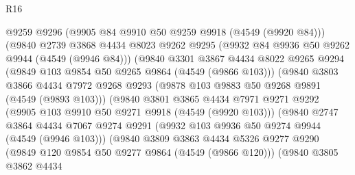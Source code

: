 \begin{lexlean}{R16}
\begin{coremodule}
                            @9259
                            @9296
                            (@9905 @84 @9910 @50 @9259 @9918 (@4549 (@9920 @84)))
                            (@9840
                              @2739
                              @3868
                              @4434
                              @8023
                              @9262
                              @9295
                              (@9932 @84 @9936 @50 @9262 @9944 (@4549 (@9946 @84)))
                              (@9840
                                @3301
                                @3867
                                @4434
                                @8022
                                @9265
                                @9294
                                (@9849 @103 @9854 @50 @9265 @9864 (@4549 (@9866 @103)))
                                (@9840
                                  @3803
                                  @3866
                                  @4434
                                  @7972
                                  @9268
                                  @9293
                                  (@9878 @103 @9883 @50 @9268 @9891 (@4549 (@9893 @103)))
                                  (@9840
                                    @3801
                                    @3865
                                    @4434
                                    @7971
                                    @9271
                                    @9292
                                    (@9905 @103 @9910 @50 @9271 @9918 (@4549 (@9920 @103)))
                                    (@9840
                                      @2747
                                      @3864
                                      @4434
                                      @7067
                                      @9274
                                      @9291
                                      (@9932 @103 @9936 @50 @9274 @9944 (@4549 (@9946 @103)))
                                      (@9840
                                        @3809
                                        @3863
                                        @4434
                                        @5326
                                        @9277
                                        @9290
                                        (@9849 @120 @9854 @50 @9277 @9864 (@4549 (@9866 @120)))
                                        (@9840
                                          @3805
                                          @3862
                                          @4434

\end{coremodule}
\end{lexlean}
